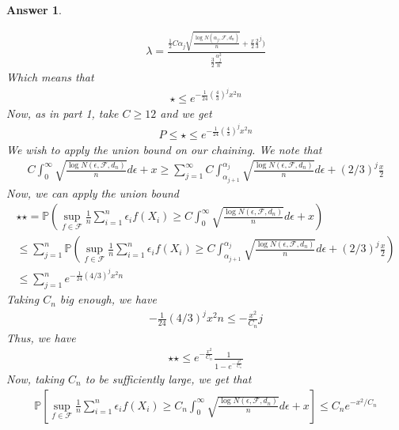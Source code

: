\documentclass[12pt]{article}
\theoremstyle{colon}
\newtheorem*{answer}{Answer}
\begin{document}
\begin{answer}
\begin{enumerate}[label=\arabic*)]
\begin{gather*}
        \lambda = \frac{\frac{1}{2} C \alpha_j \sqrt{\frac{\log N(\alpha_j, \mathcal{F}, d_n) }{n}} + \frac{x}{2} \frac{2}{3}^j)}{\frac{3}{2} \frac{\alpha_j^2}{n}}
      \end{gather*}
      Which means that
      \begin{gather*}
        \star \leq e^{-\frac{1}{24}(\frac{4}{3})^j x^2 n}
      \end{gather*}
      Now, as in part 1, take $C \geq 12$ and we get
      \begin{gather*}
        P \leq \star \leq e^{-\frac{1}{24}(\frac{4}{3})^j x^2 n}
      \end{gather*}
      We wish to apply the union bound on our chaining. We note that
      \begin{gather*}
        C \int_0^\infty \sqrt{\frac{\log N(\epsilon, \mathcal{F}, d_n)}{n}} d\epsilon + x \geq \sum_{j=1}^\infty C \int_{\alpha_{j+1}}^{\alpha_j} \sqrt{\frac{\log N(\epsilon, \mathcal{F}, d_n)}{n}} d\epsilon + (2/3)^j \frac{x}{2}
      \end{gather*}
      Now, we can apply the union bound
      \begin{gather*}
        \star \star = \mathbb{P}( \sup_{f \in \mathcal{F}} \frac{1}{n} \sum_{i=1}^n \epsilon_i f(X_i) \geq C \int_0^\infty \sqrt{\frac{\log N(\epsilon, \mathcal{F}, d_n)}{n}} d\epsilon + x) \\
        \leq \sum_{j=1}^n \mathbb{P}(\sup_{f \in \mathcal{F}} \frac{1}{n} \sum_{i=1}^n \epsilon_i f(X_i) \geq C \int_{\alpha_{j+1}}^{\alpha_j} \sqrt{\frac{\log N(\epsilon, \mathcal{F}, d_n)}{n}} d\epsilon + (2/3)^j \frac{x}{2}) \\
        \leq \sum_{j=1}^n e^{-\frac{1}{24} (4/3)^j x^2 n}
      \end{gather*}
      Taking $C_n$ big enough, we have
      \begin{gather*}
        -\frac{1}{24} (4/3)^j x^2 n \leq - \frac{x^2}{C_n} j
      \end{gather*}
      Thus, we have
      \begin{gather*}
        \star \star \leq e^{-\frac{x^2}{C_n}} \frac{1}{1 - e^{-\frac{x^2}{C_n}}}
      \end{gather*}
      Now, taking $C_n$ to be sufficiently large, we get that
      \begin{gather*}
        \mathbb{P} \left[ \sup_{f \in \mathcal{F}} \frac{1}{n} \sum_{i=1}^n \epsilon_i f(X_i) \geq C_n \int_0^\infty \sqrt{\frac{\log N(\epsilon, \mathcal{F}, d_n)}{n}} d\epsilon + x \right] \leq C_n e^{-x^2/C_n}
      \end{gather*}

\end{enumerate}
\end{answer}
\end{document}
